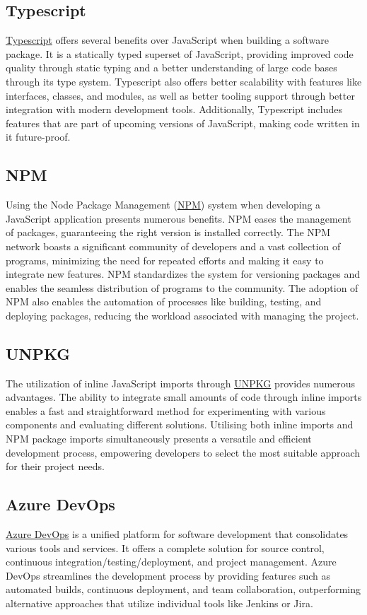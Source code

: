 \documentclass{l4proj}
\begin{document}
\subsection{Typescript}
\href{https://www.typescriptlang.org/}{Typescript} \text offers several benefits over JavaScript when building a software package. It is a statically typed superset of JavaScript, providing improved code quality through static typing and a better understanding of large code bases through its type system. Typescript also offers better scalability with features like interfaces, classes, and modules, as well as better tooling support through better integration with modern development tools. Additionally, Typescript includes features that are part of upcoming versions of JavaScript, making code written in it future-proof.

\subsection{NPM}
\text Using the Node Package Management (\href{https://www.npmjs.com/}{NPM}) system when developing a JavaScript application presents numerous benefits. NPM eases the management of packages, guaranteeing the right version is installed correctly. The NPM network boasts a significant community of developers and a vast collection of programs, minimizing the need for repeated efforts and making it easy to integrate new features. NPM standardizes the system for versioning packages and enables the seamless distribution of programs to the community. The adoption of NPM also enables the automation of processes like building, testing, and deploying packages, reducing the workload associated with managing the project.


\subsection{UNPKG}
\text The utilization of inline JavaScript imports through \href{https://unpkg.com/}{UNPKG} provides numerous advantages. The ability to integrate small amounts of code through inline imports enables a fast and straightforward method for experimenting with various components and evaluating different solutions. Utilising both inline imports and NPM package imports simultaneously presents a versatile and efficient development process, empowering developers to select the most suitable approach for their project needs.

\subsection{Azure DevOps}
 \href{https://azure.microsoft.com/en-us/products/devops}{Azure DevOps} \text is a unified platform for software development that consolidates various tools and services. It offers a complete solution for source control, continuous integration/testing/deployment, and project management. Azure DevOps streamlines the development process by providing features such as automated builds, continuous deployment, and team collaboration, outperforming alternative approaches that utilize individual tools like Jenkins or Jira.
\end{document}
